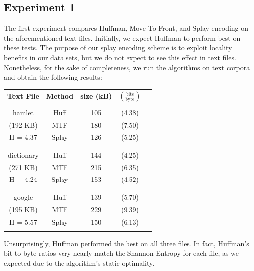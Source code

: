 \documentclass[twoside]{article}
\begin{document}
\begin{multicols}{2}
\subsection*{Experiment 1}
The first experiment compares Huffman, Move-To-Front, and Splay encoding on the aforementioned text files. Initially, we expect Huffman to perform best on these tests. The purpose of our splay encoding scheme is to exploit locality benefits in our data sets, but we do not expect to see this effect in text files. Nonetheless, for the sake of completeness, we run the algorithms on text corpora and obtain the following results:
\begin{center}
\begin{tabular}{ c c c c c }
Text File   & Method & size (kB) & $(\frac{\text{bits}}{\text{byte}})$  \\ \hline \vspace{-0.75em}  \\ 
hamlet  	& Huff  & 105 & (4.38) \\
(192 KB)    & MTF   & 180 & (7.50) \\
H = 4.37    & Splay & 126 & (5.25) \\
\vspace{-0.75em} \\ \hline \vspace{-0.75em} \\
dictionary  & Huff  & 144 & (4.25) \\
(271 KB)    & MTF   & 215 & (6.35) \\
H = 4.24    & Splay & 153 & (4.52) \\
\vspace{-0.75em} \\ \hline \vspace{-0.75em} \\
google      & Huff  & 139 & (5.70) \\
(195 KB)    & MTF   & 229 & (9.39) \\
H = 5.57    & Splay & 150 & (6.13) \\
\vspace{-0.75em} \\ \hline
\end{tabular}
\end{center}

Unsurprisingly, Huffman performed the best on all three files. In fact, Huffman's bit-to-byte ratios very nearly match the Shannon Entropy for each file, as we expected due to the algorithm's static optimality. 


\end{multicols}
\end{document}
